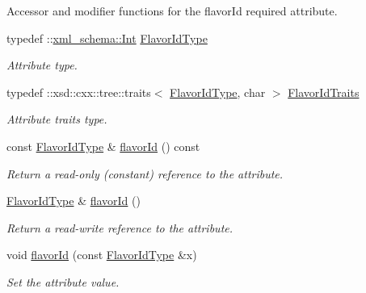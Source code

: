 Accessor and modifier functions for the flavorId required attribute. \begin{DoxyCompactItemize}
\item 
\hypertarget{classopenstack_1_1xml_1_1Resize_aa31a13a5db9fb12fb0be8b0dc79dc3f7}{
typedef ::\hyperlink{namespacexml__schema_a12d975a13061c938969b2b5143e97645}{xml\_\-schema::Int} \hyperlink{classopenstack_1_1xml_1_1Resize_aa31a13a5db9fb12fb0be8b0dc79dc3f7}{FlavorIdType}}
\label{classopenstack_1_1xml_1_1Resize_aa31a13a5db9fb12fb0be8b0dc79dc3f7}

\begin{DoxyCompactList}\small\item\em Attribute type. \item\end{DoxyCompactList}\item 
\hypertarget{classopenstack_1_1xml_1_1Resize_a289d75f9b7de37496f2ce98690dcb864}{
typedef ::xsd::cxx::tree::traits$<$ \hyperlink{classopenstack_1_1xml_1_1Resize_aa31a13a5db9fb12fb0be8b0dc79dc3f7}{FlavorIdType}, char $>$ \hyperlink{classopenstack_1_1xml_1_1Resize_a289d75f9b7de37496f2ce98690dcb864}{FlavorIdTraits}}
\label{classopenstack_1_1xml_1_1Resize_a289d75f9b7de37496f2ce98690dcb864}

\begin{DoxyCompactList}\small\item\em Attribute traits type. \item\end{DoxyCompactList}\item 
const \hyperlink{classopenstack_1_1xml_1_1Resize_aa31a13a5db9fb12fb0be8b0dc79dc3f7}{FlavorIdType} \& \hyperlink{classopenstack_1_1xml_1_1Resize_a1c1fbfaddf298793004209f12c46c74d}{flavorId} () const 
\begin{DoxyCompactList}\small\item\em Return a read-\/only (constant) reference to the attribute. \item\end{DoxyCompactList}\item 
\hyperlink{classopenstack_1_1xml_1_1Resize_aa31a13a5db9fb12fb0be8b0dc79dc3f7}{FlavorIdType} \& \hyperlink{classopenstack_1_1xml_1_1Resize_a8d28f841fcc1628668bd1f9dc275a3ef}{flavorId} ()
\begin{DoxyCompactList}\small\item\em Return a read-\/write reference to the attribute. \item\end{DoxyCompactList}\item 
void \hyperlink{classopenstack_1_1xml_1_1Resize_a5d61e316ab699ef2d4d4f1a992e1f441}{flavorId} (const \hyperlink{classopenstack_1_1xml_1_1Resize_aa31a13a5db9fb12fb0be8b0dc79dc3f7}{FlavorIdType} \&x)
\begin{DoxyCompactList}\small\item\em Set the attribute value. \item\end{DoxyCompactList}\end{DoxyCompactItemize}
